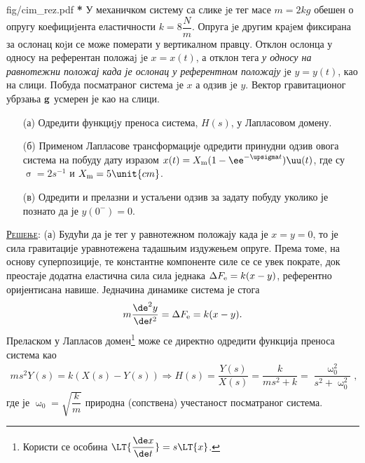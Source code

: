 \begin{slikaDesno}{fig/cim_rez.pdf}
    \textbf{\color{red}*}\PID
    У механичком систему са слике jе тег масе $m = 2\unit{kg}$ 
    обешен о опругу коефициjента
    еластичности $k = 8\unit{\dfrac Nm}$. 
    Опруга jе другим краjем фиксирана за ослонац коjи се може померати
    у вертикалном правцу. Отклон ослонца у односу на референтан положаj jе $x = x(t)$,
    а отклон тега \textit{у односу на равнотежни положај када је ослонац у 
    референтном положају} jе
    $y = y(t)$, као на слици. Побуда посматраног система jе $x$ а одзив jе $y$.
    Вектор гравитационог убрзања $\bf g$ усмерен је као на слици.
    \begin{enumerate}
        \item[(а)] Одредити функциjу преноса система, $H(s)$, у Лапласовом домену. 
    \end{enumerate}
\end{slikaDesno}
\begin{enumerate}
    \item[(б)] Применом Лапласове трансформације одредити
    принудни одзив овога система на побуду дату изразом
    $x(t) = X_{\rm m} (1 - \ee^{-\upsigma t}) \uu(t)$, где су 
    $\upsigma = 2 \unit{s^{-1}}$ и
    $X_{\rm m} = 5\unit{cm}$. 
    \item[(в)] Одредити и прелазни и устаљени одзив за задату побуду уколико је познато да је 
    $y(0^-) = 0$. 
\end{enumerate}

\textsc{\underline{Решење}}:
(а) Будући да је тег у равнотежном положају када је $x = y = 0$, то је сила гравитације уравнотежена тадашњим издужењем опруге. 
Према томе, на основу суперпозиције, те константне компоненте силе се се увек пократе, док преостаје додатна еластична сила
сила једнака $\Delta F_{\rm e} = k(x - y)$, референтно оријентисана навише. Једначина динамике система је стога 
\begin{equation}
    m \dfrac{\de^2 y}{\de t^2} = \Delta F_{\rm e} = k(x - y). 
\end{equation}
Преласком у Лапласов домен\footnote{Користи се особина $\LT{ \dfrac{\de x}{\de t} } = s \LT{x}$. } може се 
директно одредити функција преноса система као 
\begin{eqnarray}
    ms^2 Y(s) = k( X(s) - Y(s) ) 
    \Rightarrow
    H(s) = \dfrac{Y(s)}{X(s)} = \dfrac{k}{ms^2 + k} = \dfrac{\upomega_0^2}{s^2 + \upomega_0^2},
\end{eqnarray}
где је $\upomega_0 = \sqrt{\dfrac{k}{m}}$ природна (сопствена) учестаност посматраног система. 

